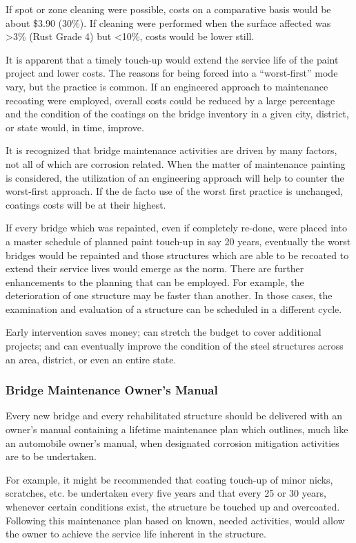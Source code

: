 If spot or zone cleaning were possible, costs on a comparative basis would be about \$3.90 (30\%). If cleaning
were performed when the surface affected was >3\% (Rust Grade 4) but <10\%, costs would be lower still.

It is apparent that a timely touch-up would extend the service life of the paint project and lower costs. The
reasons for being forced into a “worst-first” mode vary, but the practice is common. If an engineered approach to
maintenance recoating were employed, overall costs could be reduced by a large percentage and the condition of the
coatings on the bridge inventory in a given city, district, or state would, in time, improve.

It is recognized that bridge maintenance activities are driven by many factors, not all of which are corrosion
related. When the matter of maintenance painting is considered, the utilization of an engineering approach will help
to counter the worst-first approach. If the de facto use of the worst first practice is unchanged, coatings costs will be
at their highest.

If every bridge which was repainted, even if completely re-done, were placed into a master schedule of planned
paint touch-up in say 20 years, eventually the worst bridges would be repainted and those structures which are able to
be recoated to extend their service lives would emerge as the norm. There are further enhancements to the planning
that can be employed. For example, the deterioration of one structure may be faster than another. In those cases, the
examination and evaluation of a structure can be scheduled in a different cycle.

Early intervention saves money; can stretch the budget to cover additional projects; and can eventually improve
the condition of the steel structures across an area, district, or even an entire state.


\subsubsection{Bridge Maintenance Owner’s Manual}

Every new bridge and every rehabilitated structure should be delivered with an owner’s manual containing a
lifetime maintenance plan which outlines, much like an automobile owner’s manual, when designated corrosion
mitigation activities are to be undertaken.

For example, it might be recommended that coating touch-up of minor nicks, scratches, etc. be undertaken every
five years and that every 25 or 30 years, whenever certain conditions exist, the structure be touched up and
overcoated. Following this maintenance plan based on known, needed activities, would allow the owner to achieve
the service life inherent in the structure.

